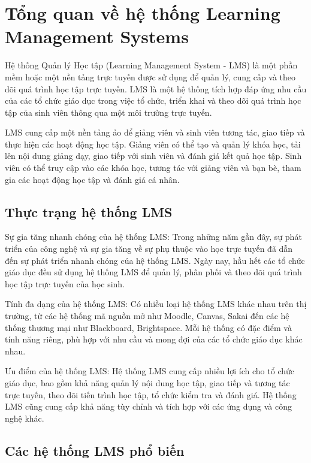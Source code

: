 \documentclass[../Thesis.tex]{subfiles}
\begin{document}
\section{Tổng quan về hệ thống Learning Management Systems}

Hệ thống Quản lý Học tập (Learning Management System - LMS) là một phần mềm hoặc một nền tảng trực tuyến được sử dụng để quản lý, cung cấp và theo dõi quá trình học tập trực tuyến. LMS là một hệ thống tích hợp đáp ứng nhu cầu của các tổ chức giáo dục trong việc tổ chức, triển khai và theo dõi quá trình học tập của sinh viên thông qua một môi trường trực tuyến.

LMS cung cấp một nền tảng ảo để giảng viên và sinh viên tương tác, giao tiếp và thực hiện các hoạt động học tập. Giảng viên có thể tạo và quản lý khóa học, tải lên nội dung giảng dạy, giao tiếp với sinh viên và đánh giá kết quả học tập. Sinh viên có thể truy cập vào các khóa học, tương tác với giảng viên và bạn bè, tham gia các hoạt động học tập và đánh giá cá nhân.

	\subsection{Thực trạng hệ thống LMS}
		Sự gia tăng nhanh chóng của hệ thống LMS: Trong những năm gần đây, sự phát triển của công nghệ và sự gia tăng về sự phụ thuộc vào học trực tuyến đã dẫn đến sự phát triển nhanh chóng của hệ thống LMS. Ngày nay, hầu hết các tổ chức giáo dục đều sử dụng hệ thống LMS để quản lý, phân phối và theo dõi quá trình học tập trực tuyến của học sinh.

		Tính đa dạng của hệ thống LMS: Có nhiều loại hệ thống LMS khác nhau trên thị trường, từ các hệ thống mã nguồn mở như Moodle, Canvas, Sakai đến các hệ thống thương mại như Blackboard, Brightspace. Mỗi hệ thống có đặc điểm và tính năng riêng, phù hợp với nhu cầu và mong đợi của các tổ chức giáo dục khác nhau.
		
		Ưu điểm của hệ thống LMS: Hệ thống LMS cung cấp nhiều lợi ích cho tổ chức giáo dục, bao gồm khả năng quản lý nội dung học tập, giao tiếp và tương tác trực tuyến, theo dõi tiến trình học tập, tổ chức kiểm tra và đánh giá. Hệ thống LMS cũng cung cấp khả năng tùy chỉnh và tích hợp với các ứng dụng và công nghệ khác.
		
	\subsection{Các hệ thống LMS phổ biến}
\end{document}
